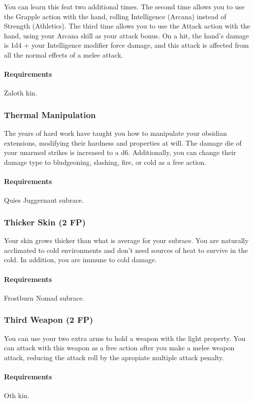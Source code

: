     You can learn this feat two additional times.
    The second time allows you to use the Grapple action with the hand, rolling Intelligence (Arcana) instead of Strength (Athletics).
    The third time allows you to use the Attack action with the hand, using your Arcana skill as your attack bonus.
    On a hit, the hand's damage is 1d4 + your Intelligence modifier force damage, and this attack is affected from all the normal effects of a melee attack.
    \paragraph{Requirements} Zaloth kin.
\subsubsection{Thermal Manipulation} \label{feat::thermalmanipulation}
    The years of hard work have taught you how to manipulate your obsidian extensions, modifying their hardness and properties at will.
    The damage die of your unarmed strikes is increased to a d6.
    Additionally, you can change their damage type to bludgeoning, slashing, fire, or cold as a free action.
    \paragraph{Requirements} Quies Juggernaut subrace.
\subsubsection{Thicker Skin (2 FP)} \label{feat::thickerskin}
    Your skin grows thicker than what is average for your subrace.
    You are naturally acclimated to cold environments and don't need sources of heat to survive in the cold.
    In addition, you are immune to cold damage.

    \paragraph{Requirements} Frostburn Nomad subrace.
\subsubsection{Third Weapon (2 FP)} \label{feat::thirdweapon}
    You can use your two extra arms to hold a weapon with the light property.
    You can attack with this weapon as a free action after you make a melee weapon attack, reducing the attack roll by the apropiate multiple attack penalty.
    \paragraph{Requirements} Oth kin.
